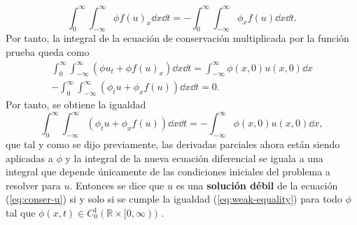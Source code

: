 \begin{equation}
	\int_{0}^{\infty}\int_{-\infty}^{\infty}  \phi f(u)_x \dd{x}\dd{t} =  -\int_{0}^{\infty}\int_{-\infty}^{\infty} \phi_x f(u) \dd{x}\dd{t}.
\end{equation}
Por tanto, la integral de la ecuación de conservación multiplicada por la función prueba queda como
\begin{equation}
\begin{aligned}
	\int_{0}^{\infty}\int_{-\infty}^{\infty}\left(\phi u_t + \phi f(u)_x\right) \dd{x}\dd{t} = \int_{-\infty}^{\infty} \phi(x,0)u(x,0) \dd{x} \\
	-\int_{0}^{\infty}\int_{-\infty}^{\infty}\left(\phi_t u + \phi_x f(u)\right) \dd{x}\dd{t} = 0.
\end{aligned}
\end{equation}
Por tanto, se obtiene la igualdad
\begin{equation}
	\int_{0}^{\infty}\int_{-\infty}^{\infty}\left(\phi_t u + \phi_x f(u)\right) \dd{x}\dd{t} = -\int_{-\infty}^{\infty} \phi(x,0)u(x,0) \dd{x},
	\label{eq:weak-equality}
\end{equation}
que tal y como se dijo previamente, las derivadas parciales ahora están siendo aplicadas a $\phi$ y la integral de la nueva ecuación diferencial se iguala a una integral que depende únicamente de las condiciones iniciales del problema a resolver para $u$. Entonces se dice que $u$ es una \textbf{solución débil} de la ecuación (\ref{eq:conser-u}) si y solo si se cumple la igualdad (\ref{eq:weak-equality}) para todo $\phi$ tal que $\phi(x,t) \in C_{0}^{1} (\mathbb{R} \times [0, \infty))$ \cite{Leveque}.

